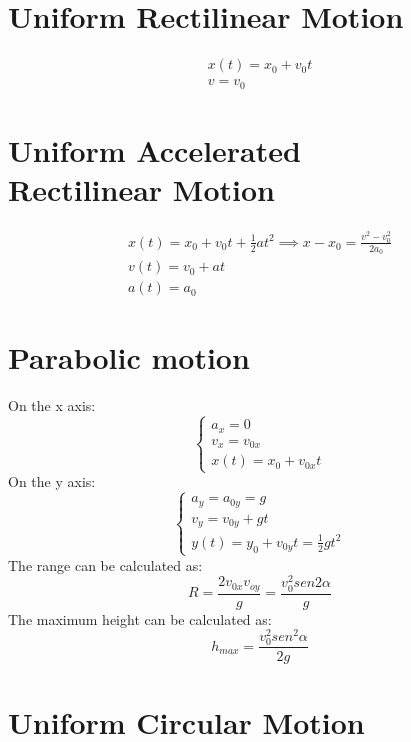 \documentclass[Master.tex]{subfiles}
\begin{document}
\begin{multicols}{2}

		 \section{Uniform Rectilinear Motion}
		  \begin{gather*}
				   x(t) = x_0 + v_0t\\
				   v = v_0
		  \end{gather*}

		 \section{Uniform Accelerated \\Rectilinear Motion}
		  \begin{gather*}
				   x(t) = x_0 + v_0t + \frac{1}{2}at^2 \implies x-x_0 = \frac{v^2-v_0^2}{2 a_0} \\
				   v(t) = v_0 + at \\
				   a(t) = a_0
		  \end{gather*}

		 \section{Parabolic motion}
		  On the x axis:
		  \begin{equation*}
				   \begin{cases}
						    a_{x} = 0      \\
						    v_{x} = v_{0x} \\
						    x(t) = x_0 + v_{0x}t
				   \end{cases}
		  \end{equation*}
		  On the y axis:
		  \begin{equation*}
				   \begin{cases}
						    a_{y} = a_{0y} = g  \\
						    v_{y} = v_{0y} + gt \\
						    y(t) = y_0 + v_{0y}t = \frac{1}{2}gt^2
				   \end{cases}
		  \end{equation*}
		  The range can be calculated as:
		  \[
				   R = \frac{2 v_{0x}v_{oy}}{g} = \frac{v_{0}^2 sen 2 \alpha }{g}
		  \]
		  The maximum height can be calculated as:
		  \[
				   h_{max} = \frac{v_0^2 sen^2\alpha }{2g}
		  \]
		 \section{Uniform Circular Motion}

\end{multicols}
\end{document}
